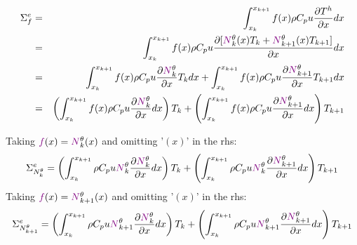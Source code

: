 \begin{eqnarray}
{\Sigma}_f^e 
&=&\int_{x_k}^{x_{k+1}} f(x) \rho C_p u\frac{\partial T^h}{\partial x} dx \nonumber\\
&=&\int_{x_k}^{x_{k+1}} f(x) \rho C_p u\frac{\partial 
[ {\color{violet}N}_{k}^\theta(x) {T}_k + {\color{violet}N}_{k+1}^\theta(x) {T}_{k+1} ] }{\partial x} dx \nonumber\\
&=&\int_{x_k}^{x_{k+1}} f(x) \rho C_p u\frac{\partial  {\color{violet}N}_{k}^\theta }{\partial x} T_k dx 
+  \int_{x_k}^{x_{k+1}} f(x) \rho C_p u\frac{\partial  {\color{violet}N}_{k+1}^\theta }{\partial x} T_{k+1} dx \nonumber\\
&=& \left(  \int_{x_k}^{x_{k+1}} f(x) \rho C_p u\frac{\partial  {\color{violet}N}_{k}^\theta }{\partial x} dx \right) T_k 
+ \left( \int_{x_k}^{x_{k+1}} f(x) \rho C_p u\frac{\partial  {\color{violet}N}_{k+1}^\theta }{\partial x} dx \right)T_{k+1}  \nonumber
\end{eqnarray}

Taking ${\color{violet}f}(x)={\color{violet}N}_k^\theta(x)$ and omitting '$(x)$' in the rhs:
\[
{\Sigma}_{N_k^\theta}^e=
\left( \int_{x_k}^{x_{k+1}} \rho C_p u {\color{violet}N}_k^\theta \frac{\partial  {\color{violet}N}_{k}^\theta }{\partial x} dx \right) T_k 
+ 
\left( \int_{x_k}^{x_{k+1}} \rho C_p u {\color{violet}N}_k^\theta \frac{\partial  {\color{violet}N}_{k+1}^\theta }{\partial x} dx \right)T_{k+1}  \nonumber
\]
Taking ${\color{violet}f}(x)={\color{violet}N}_{k+1}^\theta(x)$ and omitting '$(x)$' in the rhs:
\[
{\Sigma}_{N_{k+1}^\theta}^e=
\left( \int_{x_k}^{x_{k+1}} \rho C_p u {\color{violet}N}_{k+1}^\theta \frac{\partial  {\color{violet}N}_{k}^\theta }{\partial x} dx \right) T_k + 
\left( \int_{x_k}^{x_{k+1}} \rho C_p u {\color{violet}N}_{k+1}^\theta \frac{\partial  {\color{violet}N}_{k+1}^\theta }{\partial x} dx \right)T_{k+1}  \nonumber
\]



